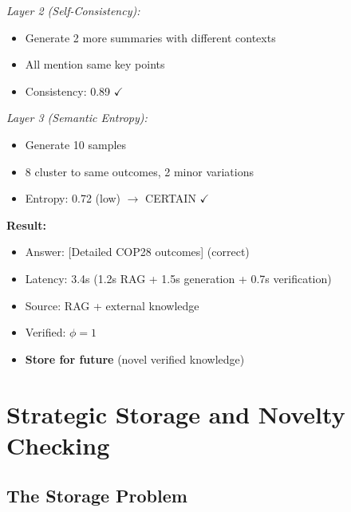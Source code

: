 \documentclass[12pt,a4paper]{article}
\theoremstyle{definition}
\begin{document}
\begin{examplebox}[title=Tier 3: RAG + Comprehensive Verification]
\textit{Layer 2 (Self-Consistency):}
\begin{itemize}
    \item Generate 2 more summaries with different contexts
    \item All mention same key points
    \item Consistency: 0.89 $\checkmark$
\end{itemize}

\textit{Layer 3 (Semantic Entropy):}
\begin{itemize}
    \item Generate 10 samples
    \item 8 cluster to same outcomes, 2 minor variations
    \item Entropy: 0.72 (low) $\rightarrow$ CERTAIN $\checkmark$
\end{itemize}

\textbf{Result:}
\begin{itemize}
    \item Answer: [Detailed COP28 outcomes] (correct)
    \item Latency: 3.4s (1.2s RAG + 1.5s generation + 0.7s verification)
    \item Source: RAG + external knowledge
    \item Verified: $\phi = 1$
    \item \textbf{Store for future} (novel verified knowledge)
\end{itemize}
\end{examplebox}

\newpage

\section{Strategic Storage and Novelty Checking}

\subsection{The Storage Problem}
\end{document}
